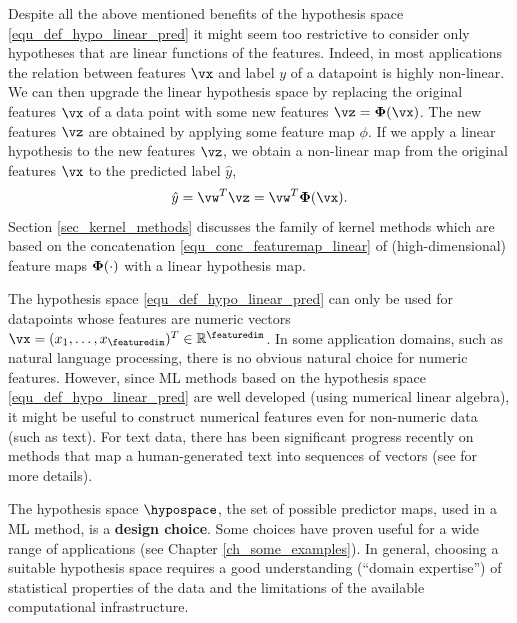 \documentclass[12pt]{report}
\begin{document}
Despite all the above mentioned benefits of the hypothesis space \eqref{equ_def_hypo_linear_pred} 
it might seem too restrictive to consider only hypotheses that are linear functions 
of the features. Indeed, in most applications the relation between features $\vx$ 
and label $y$ of a datapoint is highly non-linear. We can then upgrade the 
linear hypothesis space by replacing the original features $\vx$ of a data 
point with some new features $\vz = {\bf \Phi} (\vx)$. The new features $\vz$ 
are obtained by applying some feature map $\phi$. If we apply a  
linear hypothesis to the new features $\vz$, we obtain a non-linear 
map from the original features $\vx$ to the predicted label $\hat{y}$, 
\begin{equation}
\label{equ_conc_featuremap_linear}
\hat{y} = \vw^{T} \vz = \vw^{T} {\bf \Phi} (\vx). 
\end{equation} 
Section \ref{sec_kernel_methods} discusses the family of 
kernel methods which are based on the concatenation \eqref{equ_conc_featuremap_linear} of 
(high-dimensional) feature maps ${\bf \Phi}(\cdot)$ 
with a linear hypothesis map. 



The hypothesis space \eqref{equ_def_hypo_linear_pred} can 
only be used for datapoints whose features are numeric 
vectors $\vx = (x_{1},\ldots,x_{\featuredim})^{T} \in \mathbb{R}^{\featuredim}$. 
In some application domains, such as natural language 
processing, there is no obvious natural choice for numeric 
features. However, since ML methods based on the hypothesis 
space \eqref{equ_def_hypo_linear_pred} are well developed 
(using numerical linear algebra), it might be useful to construct 
numerical features even for non-numeric data (such as text). 
For text data, there has been significant progress recently on 
methods that map a human-generated text into sequences of 
vectors (see \cite[Chap. 12]{Goodfellow-et-al-2016} for more details). 

The hypothesis space $\hypospace$, the set of possible predictor maps, 
used in a ML method, is a {\bf design choice}. Some choices have 
proven useful for a wide range of applications (see Chapter \ref{ch_some_examples}). 
In general, choosing a suitable hypothesis space requires a good 
understanding (``domain expertise'') of statistical properties of 
the data and the limitations of the available computational infrastructure. 
\end{document}
